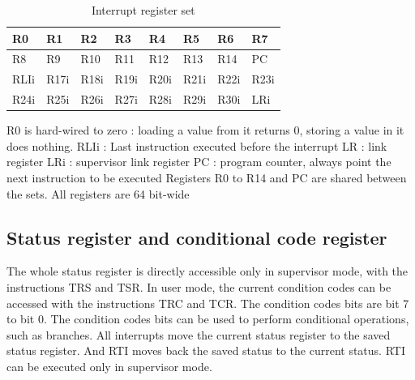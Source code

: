 \documentclass[11pt]{article}
\begin{document}
\begin{table}[h!]
    \begin{center}
        \caption{Interrupt register set}
        \label{tab:irs}
        \begin{tabular}{|l|l|l|l|l|l|l|l|}
            \hline
            R0  & R1    & R2    & R3    & R4    & R5    & R6    & R7 \\
            \hline
            R8    & R9    & R10   & R11   & R12   & R13   & R14  & PC \\
            \hline
            RLIi & R17i    & R18i    & R19i    & R20i    & R21i    & R22i    & R23i \\
            \hline
            R24i    & R25i    & R26i   & R27i   & R28i   & R29i   &  R30i  & LRi \\
            \hline
        \end{tabular}
    \end{center}
\end{table}

R0 is hard-wired to zero : loading a value from it returns 0,
storing a value in it does nothing. \newline
RLIi : Last instruction executed before the interrupt\newline
LR : link register\newline
LRi : supervisor link register\newline
PC : program counter, always point the next instruction to be executed\newline
Registers R0 to R14 and PC are shared between the sets. \newline
All registers are 64 bit-wide\newline

\newpage
\subsection{Status register and conditional code register}
The whole status register is directly accessible only in supervisor mode, with the instructions TRS and TSR.
In user mode, the current condition codes can be accessed with the instructions TRC and TCR.
The condition codes bits are bit 7 to bit 0. The condition codes bits can be used to perform conditional
operations, such as branches. 
All interrupts move the current status register to the saved status register. And RTI moves back the saved status
to the current status. RTI can be executed only in supervisor mode. 
\end{document}
